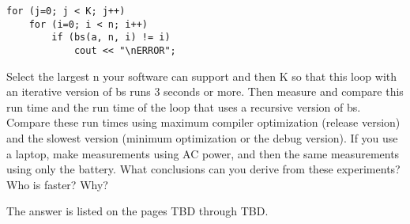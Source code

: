 \documentclass{article}
\begin{document}
		\begin{verbatim}
for (j=0; j < K; j++)
    for (i=0; i < n; i++)
        if (bs(a, n, i) != i)
            cout << "\nERROR";
		\end{verbatim}
		
		
		Select the largest n your software can support and then K so that this loop with an iterative version of bs runs 3 seconds or more. Then measure and compare this run time and the run time of the loop that uses a recursive version of bs. Compare these run times using maximum compiler optimization (release version) and the slowest version (minimum optimization or the debug version). If you use a laptop, make measurements using AC power, and then the same measurements using only the battery. What conclusions can you derive from these experiments? Who is faster? Why?
		\newline
		
		The answer is listed on the pages TBD through TBD.
	

\paragraph{}\
\paragraph{}\

		\rmfamily\
		
\end{document}
